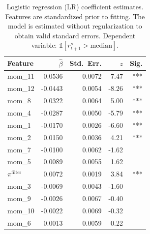 \begin{table}[htbp]
\centering
\small
\begin{tabular}{l r r r r}
\toprule
Feature & $\hat{\beta}$ & Std.\ Err. & $z$ & Sig. \\
\midrule
mom\_11 & 0.0536 & 0.0072 & 7.47 & *** \\
mom\_12 & -0.0443 & 0.0054 & -8.26 & *** \\
mom\_8 & 0.0322 & 0.0064 & 5.00 & *** \\
mom\_4 & -0.0287 & 0.0050 & -5.79 & *** \\
mom\_1 & -0.0170 & 0.0026 & -6.60 & *** \\
mom\_2 & 0.0150 & 0.0036 & 4.21 & *** \\
mom\_7 & -0.0100 & 0.0062 & -1.62 &  \\
mom\_5 & 0.0089 & 0.0055 & 1.62 &  \\
$\pi^{\text{filter}}$ & 0.0072 & 0.0019 & 3.84 & *** \\
mom\_3 & -0.0069 & 0.0043 & -1.60 &  \\
mom\_9 & -0.0026 & 0.0067 & -0.40 &  \\
mom\_10 & -0.0022 & 0.0069 & -0.32 &  \\
mom\_6 & 0.0013 & 0.0059 & 0.22 &  \\
\bottomrule
\end{tabular}
\caption{Logistic regression (LR) coefficient estimates. Features are standardized prior to fitting. The model is estimated without regularization to obtain valid standard errors. Dependent variable: $\mathbb{1}[r_{t+1}^s > \text{median}]$.}
\label{tab:lr_coef}
\end{table}